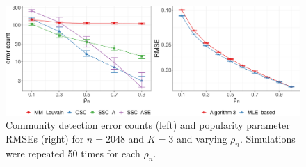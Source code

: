 \documentclass[
  12pt,
]{article}
\begin{document}
\begin{figure}[H]

{\centering \includegraphics[width=1\linewidth]{supplemental-materials_files/figure-latex/sparsity_sim-1} 

}

\caption{Community detection error counts (left) and popularity parameter RMSEs (right) for $n = 2048$ and $K = 3$ and varying $\rho_n$. Simulations were repeated 50 times for each $\rho_n$.}\label{fig:sparsity_sim}
\end{figure}

\renewcommand\refname{Choice of \(\vartheta\) for the Subspace Detection
Property}
  
\end{document}

